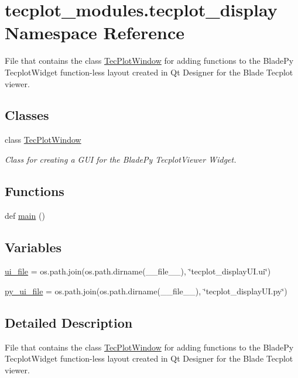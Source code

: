 \hypertarget{a00063}{}\section{tecplot\+\_\+modules.\+tecplot\+\_\+display Namespace Reference}
\label{a00063}


File that contains the class \hyperlink{a00110}{Tec\+Plot\+Window} for adding functions to the Blade\+Py Tecplot\+Widget function-\/less layout created in Qt Designer for the Blade Tecplot viewer.  


\subsection*{Classes}
\begin{DoxyCompactItemize}
\item 
class \hyperlink{a00110}{Tec\+Plot\+Window}
\begin{DoxyCompactList}\small\item\em Class for creating a G\+UI for the Blade\+Py Tecplot\+Viewer Widget. \end{DoxyCompactList}\end{DoxyCompactItemize}
\subsection*{Functions}
\begin{DoxyCompactItemize}
\item 
def \hyperlink{a00063_ae84aaefe646aaa295bfdc9a3046a660f}{main} ()
\end{DoxyCompactItemize}
\subsection*{Variables}
\begin{DoxyCompactItemize}
\item 
\hyperlink{a00063_a6eb7c910a295eb89ac32ad8b00d5bd2e}{ui\+\_\+file} = os.\+path.\+join(os.\+path.\+dirname(\+\_\+\+\_\+file\+\_\+\+\_\+), \char`\"{}tecplot\+\_\+display\+U\+I.\+ui\char`\"{})
\item 
\hyperlink{a00063_a4ac8bfff686ecfec8b20653a09a9acc3}{py\+\_\+ui\+\_\+file} = os.\+path.\+join(os.\+path.\+dirname(\+\_\+\+\_\+file\+\_\+\+\_\+), \char`\"{}tecplot\+\_\+display\+U\+I.\+py\char`\"{})
\end{DoxyCompactItemize}


\subsection{Detailed Description}
File that contains the class \hyperlink{a00110}{Tec\+Plot\+Window} for adding functions to the Blade\+Py Tecplot\+Widget function-\/less layout created in Qt Designer for the Blade Tecplot viewer. 

